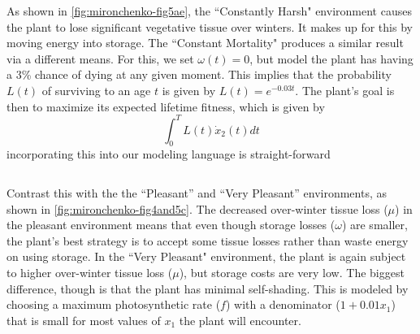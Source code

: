 \documentclass{article}
\begin{document}
As shown in \autoref{fig:mironchenko-fig5ae}, the ``Constantly Harsh" environment causes the plant to lose significant vegetative tissue over winters. It makes up for this by moving energy into storage. The ``Constant Mortality" produces a similar result via a different means. For this, we set $\omega(t)=0$, but model the plant has having a 3\% chance of dying at any given moment. This implies that the probability $L(t)$ of surviving to an age $t$ is given by $L(t)=e^{-0.03t}$. The plant's goal is then to maximize its expected lifetime fitness, which is given by
\begin{equation}
\int_0^T L(t) \dot x_2(t) dt
\end{equation}
incorporating this into our modeling language is straight-forward
\inputminted[firstline=37,lastline=38,frame=single]{python}{src/Mironchenko2014_figure5e.py}

Contrast this with the the ``Pleasant'' and ``Very Pleasant'' environments, as shown in \autoref{fig:mironchenko-fig4and5c}. The decreased over-winter tissue loss ($\mu$) in the pleasant environment means that even though storage losses ($\omega$) are smaller, the plant's best strategy is to accept some tissue losses rather than waste energy on using storage. In the ``Very Pleasant" environment, the plant is again subject to higher over-winter tissue loss ($\mu$), but storage costs are very low. The biggest difference, though is that the plant has minimal self-shading. This is modeled by choosing a maximum photosynthetic rate ($f$) with a denominator ($1+0.01x_1$) that is small for most values of $x_1$ the plant will encounter.
\end{document}
